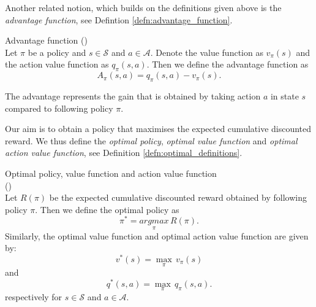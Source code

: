 Another related notion, which builds on the definitions given above is the \textit{advantage function}, see Defintion \ref{defn:advantage_function}.
\begin{defn}{\normalfont Advantage function} \label{defn:advantage_function}
{\normalfont (\cite[Section 3]{a3c_paper})}
\\
Let $\pi$ be a policy and $s \in \mathcal{S}$ and $a \in \mathcal{A}$. Denote the value function as $v_{\pi}(s)$ and the action value function as $q_{\pi}(s,a)$. Then we define the advantage function  as
\begin{equation*}
 A_{\pi}(s,a) = q_{\pi}(s,a) - v_{\pi}(s).
\end{equation*}
\end{defn}
The advantage represents the gain that is obtained by taking action $a$ in state $s$ compared to following policy $\pi$.

Our aim is to obtain a policy that maximises the expected cumulative discounted reward. We thus define the \textit{optimal policy}, \textit{optimal value function} and \textit{optimal action value function}, see Definition \ref{defn:optimal_definitions}.

\begin{defn}{\normalfont Optimal policy, value function and action value function} 
\label{defn:optimal_definitions} 
\\
{\normalfont (\cite[Section 3.6]{sutton2018reinforcement})}
\\
Let $R(\pi)$ be the expected cumulative discounted reward obtained by following policy $\pi$. Then we define the optimal policy as
\begin{equation*}
 	\pi^* = \underset{\pi}{argmax} \, R(\pi).
\end{equation*}
Similarly, the optimal value function and optimal action value function are given by: 
\begin{equation*}
 	v^*(s) = \underset{\pi}{\max} \, v_{\pi}(s)
\end{equation*}
and
\begin{equation*}
 	q^*(s,a) = \underset{\pi}{\max} \, q_{\pi}(s,a).
\end{equation*}
respectively for $s \in \mathcal{S}$ and $a \in \mathcal{A}$.
\end{defn}

